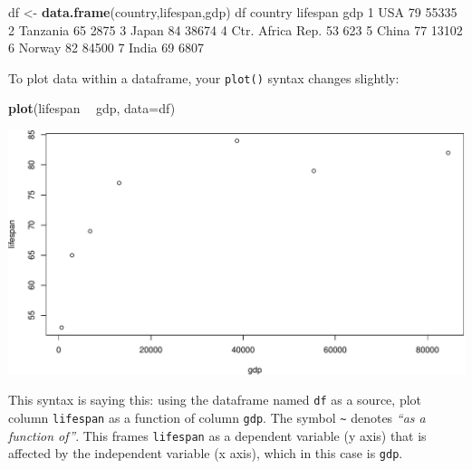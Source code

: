 \documentclass[]{book}
\newenvironment{Shaded}{\begin{snugshade}}{\end{snugshade}}
\newcommand{\DataTypeTok}[1]{\textcolor[rgb]{0.13,0.29,0.53}{#1}}
\newcommand{\DecValTok}[1]{\textcolor[rgb]{0.00,0.00,0.81}{#1}}
\newcommand{\KeywordTok}[1]{\textcolor[rgb]{0.13,0.29,0.53}{\textbf{#1}}}
\newcommand{\NormalTok}[1]{#1}
\newcommand{\OperatorTok}[1]{\textcolor[rgb]{0.81,0.36,0.00}{\textbf{#1}}}
\newcommand{\StringTok}[1]{\textcolor[rgb]{0.31,0.60,0.02}{#1}}
\begin{document}
\begin{Shaded}
\begin{Highlighting}[]
\NormalTok{df <-}\StringTok{ }\KeywordTok{data.frame}\NormalTok{(country,lifespan,gdp)}
\NormalTok{df}
\NormalTok{           country lifespan   gdp}
\DecValTok{1}\NormalTok{              USA       }\DecValTok{79} \DecValTok{55335}
\DecValTok{2}\NormalTok{         Tanzania       }\DecValTok{65}  \DecValTok{2875}
\DecValTok{3}\NormalTok{            Japan       }\DecValTok{84} \DecValTok{38674}
\DecValTok{4}\NormalTok{ Ctr. Africa Rep.       }\DecValTok{53}   \DecValTok{623}
\DecValTok{5}\NormalTok{            China       }\DecValTok{77} \DecValTok{13102}
\DecValTok{6}\NormalTok{           Norway       }\DecValTok{82} \DecValTok{84500}
\DecValTok{7}\NormalTok{            India       }\DecValTok{69}  \DecValTok{6807}
\end{Highlighting}
\end{Shaded}

To plot data within a dataframe, your \texttt{plot()} syntax changes slightly:

\begin{Shaded}
\begin{Highlighting}[]
\KeywordTok{plot}\NormalTok{(lifespan }\OperatorTok{~}\StringTok{ }\NormalTok{gdp, }\DataTypeTok{data=}\NormalTok{df)}
\end{Highlighting}
\end{Shaded}

\includegraphics{figures/unnamed-chunk-241-1.pdf}

This syntax is saying this: using the dataframe named \texttt{df} as a source, plot column \texttt{lifespan} as a function of column \texttt{gdp}. The symbol \texttt{\textasciitilde{}} denotes \emph{``as a function of''}. This frames \texttt{lifespan} as a dependent variable (y axis) that is affected by the independent variable (x axis), which in this case is \texttt{gdp}.
\end{document}
